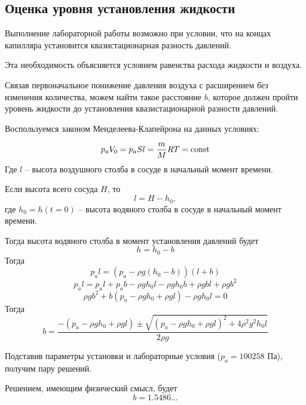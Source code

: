 \documentclass[a4paper,12pt]{article}%
\newcommand\ct[1]{\text{\rmfamily\upshape #1}}
\newcommand*{\const}{\ct{const}}
\begin{document}
\subsection{Оценка уровня установления жидкости}

Выполнение лабораторной работы возможно при условии, что на концах капилляра установится квазистационарная разность давлений. 

Эта необходимость объясняется условием равенства расхода жидкости и воздуха.

Связав первоначальное понижение давления воздуха с расширением \textit{без} изменения количества, можем найти такое расстояние $b$, которое должен пройти уровень жидкости до установления квазистационарной	 разности давлений.

Воспользуемся законом Менделеева-Клапейрона на данных условиях:

\begin{equation}
	p_aV_0=p_aSl=\frac{m}{M} RT = \const
\end{equation}
Где $l$ -- высота воздушного столба в сосуде в начальный момент времени.

Если высота всего сосуда $H$, то
\begin{equation}
	l=H-h_0,
\end{equation}
где $h_0=h(t=0)$ -- высота водяного столба в сосуде в начальный момент времени.

Тогда высота водяного столба в момент установления давлений будет
\begin{equation}
	h=h_0-b
\end{equation}
Тогда
\begin{equation}
	p_al=(p_a-\rho g (h_0-b))(l+b)
\end{equation}
\begin{equation}
	p_al=p_al+
			p_ab-
			\rho g h_0l-
			\rho g h_0b+
			\rho g bl+
			\rho g b^2
\end{equation}
\begin{equation}
			\rho g b^2+
			b(p_a-\rho g h_0+\rho g l)
			-\rho g h_0l
			=
			0
\end{equation}
Тогда
\begin{equation}
	b=\frac{-(p_a-\rho g h_0+\rho g l)\pm\sqrt{(p_a-\rho g h_0+\rho g l)^2+4\rho^2g^2h_0l}}{2\rho g}
\end{equation}

Подставив параметры установки и лабораторные условия ($p_a=100258\text{ Па}$), получим пару решений.

Решением, имеющим физический смысл, будет
\begin{equation}
	b=1.5486\ldots
\end{equation}
\end{document}
